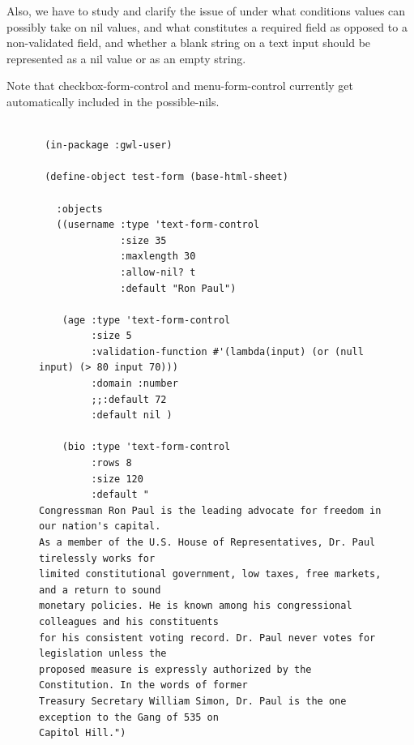 \documentclass [11pt]{book}
\begin{document}
\begin{itemize}
\begin{description}
\begin{enumerate}
\begin{itemize}
\end{itemize}



\end{enumerate}




Also, we have to study and clarify the issue of under what conditions values can possibly take on nil values, 
and what constitutes a required field as opposed to a non-validated field, and whether a blank string on a text
input should be represented as a nil value or as an empty string.

Note that checkbox-form-control and menu-form-control currently get automatically included in the possible-nils.






\end{description}




\begin{figure}
\begin{lrbox}{\boxedverb}
\begin{minipage}{\linewidth}
{\small

\begin{verbatim}

 (in-package :gwl-user)

 (define-object test-form (base-html-sheet)
  
   :objects
   ((username :type 'text-form-control
              :size 35
              :maxlength 30
              :allow-nil? t
              :default "Ron Paul")
   
    (age :type 'text-form-control
         :size 5
         :validation-function #'(lambda(input) (or (null input) (> 80 input 70)))
         :domain :number
         ;;:default 72
         :default nil )
   
    (bio :type 'text-form-control
         :rows 8
         :size 120
         :default "
Congressman Ron Paul is the leading advocate for freedom in our nation's capital. 
As a member of the U.S. House of Representatives, Dr. Paul tirelessly works for 
limited constitutional government, low taxes, free markets, and a return to sound 
monetary policies. He is known among his congressional colleagues and his constituents 
for his consistent voting record. Dr. Paul never votes for legislation unless the 
proposed measure is expressly authorized by the Constitution. In the words of former 
Treasury Secretary William Simon, Dr. Paul is the one exception to the Gang of 535 on 
Capitol Hill.")
   

\end{verbatim}}
\end{minipage}
\end{lrbox}
\end{figure}
\end{itemize}
\end{document}
